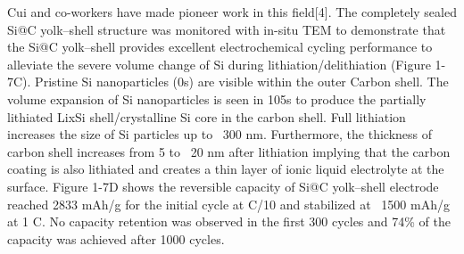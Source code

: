 Cui and co-workers have made pioneer work in this field[4]. The completely sealed Si@C yolk–shell structure was monitored with in-situ TEM to demonstrate that the Si@C yolk–shell provides excellent electrochemical cycling performance to alleviate the severe volume change of Si during lithiation/delithiation (Figure 1-7C). Pristine Si nanoparticles (0s) are visible within the outer Carbon shell. The volume expansion of Si nanoparticles is seen in 105s to produce the partially lithiated LixSi shell/crystalline Si core in the carbon shell. Full lithiation increases the size of Si particles up to ~300 nm. Furthermore, the thickness of carbon shell increases from 5 to ~20 nm after lithiation implying that the carbon coating is also lithiated and creates a thin layer of ionic liquid electrolyte at the surface. Figure 1-7D shows the reversible capacity of Si@C yolk–shell electrode reached 2833 mAh/g for the initial cycle at C/10 and stabilized at ~1500 mAh/g at 1 C. No capacity retention was observed in the first 300 cycles and 74\% of the capacity was achieved after 1000 cycles. 
